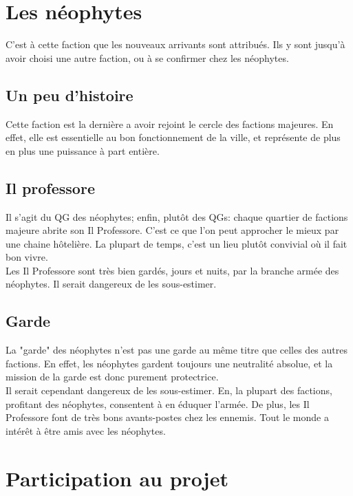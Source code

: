 \documentclass{book}
\begin{document}
\hypertarget{neophytes}{\section{Les néophytes}}
C'est à cette faction que les nouveaux arrivants sont attribués. Ils y sont jusqu'à avoir choisi une autre faction, ou à se confirmer chez les néophytes.
\subsection{Un peu d'histoire}
Cette faction est la dernière a avoir rejoint le cercle des factions majeures. En effet, elle est essentielle au bon fonctionnement de la ville, et représente de plus en plus une puissance à part entière.
\subsection{Il professore}
Il s'agit du QG des néophytes; enfin, plutôt des QGs: chaque quartier de factions majeure abrite son Il Professore. C'est ce que l'on peut approcher le mieux par une chaine hôtelière. La plupart de temps, c'est un lieu plutôt convivial où il fait bon vivre. 
\\
Les Il Professore sont très bien gardés, jours et nuits, par la branche armée des néophytes. Il serait dangereux de les sous-estimer.

\subsection{Garde}
La "garde" des néophytes n'est pas une garde au même titre que celles des autres factions. En effet, les néophytes gardent toujours une neutralité absolue, et la mission de la garde est donc purement protectrice.
\\
Il serait cependant dangereux de les sous-estimer. En, la plupart des factions, profitant des néophytes, consentent à en éduquer l'armée. De plus, les Il Professore font de très bons avants-postes chez les ennemis. Tout le monde a intérêt à être amis avec les néophytes.


\newpage
\section{Participation au projet}
\end{document}
